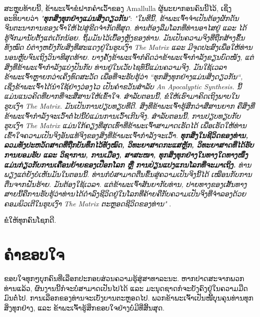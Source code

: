 \documentclass[10pt,twocolumn,letterpaper]{article}
\renewcommand{\refname}{ເອກະສານອ້າງອີງ}
\begin{document}
ສະຫຼຸບທ້າຍນີ້, ຂ້າພະເຈົ້າຂໍຝາກຄຳເວົ້າຂອງ Amallulla ຜູ້ພະຍາກອນຄົນນີ້ໄວ້, ເຊິ່ງອະທິບາຍວ່າ \textit{"\textbf{ທຸກສິ່ງທຸກຢ່າງແມ່ນສິ່ງດຽວກັນ}"}: \textit{"ໃນທີ່ນີ້, ຂ້າພະເຈົ້າຈຳເປັນຕ້ອງຜັກດັນຈິນຕະນາການຂອງເຈົ້າໃຫ້ໄປສູ່ຂີດຈຳກັດທີ່ສຸດ. ທ່ານຕ້ອງລືມໂລກທີ່ທ່ານອາໄສຢູ່ ແລະ ໄດ້ຮູ້ຈັກມານັບຕັ້ງແຕ່ເດັກນ້ອຍ. ຖິ້ມມັນໄວ້ເບື້ອງຫຼັງຂອງທ່ານ. ມັນເປັນຄວາມຈິງທີ່ຖືກສ້າງຂຶ້ນທັງໝົດ ບໍ່ຕ່າງຫຍັງກັບສິ່ງທີ່ສະແດງຢູ່ໃນຮູບເງົາ The Matrix ແລະ ມີຈຸດປະສົງເພື່ອໃຫ້ທ່ານນອນຫຼັບຈົນເຖິງວິນາທີສຸດທ້າຍ. ບາງຄັ້ງຂ້າພະເຈົ້າກໍຄິດວ່າຂ້າພະເຈົ້າກໍາລັງຂຽນບົດໜັງ, ແຕ່ສິ່ງທີ່ຂ້າພະເຈົ້າກໍາລັງແບ່ງປັນກັບ \cite{176} ທ່ານຢູ່ໃນເວັບໄຊທ໌ນີ້ແມ່ນຄວາມຈິງ. ມັນໃຊ້ເວລາຂ້າພະເຈົ້າຫຼາຍກວ່າເຄິ່ງທົດສະວັດ ເພື່ອທີ່ຈະຮັບຮູ້ວ່າ “ທຸກສິ່ງທຸກຢ່າງແມ່ນສິ່ງດຽວກັນ“, ເຊິ່ງຂ້າພະເຈົ້າໄດ້ນຳໃຊ້ຢ່າງວ່ອງໄວ ເປັນຄໍາຂວັນສໍາລັບ An Apocalyptic Synthesis. ນີ້​ແມ່ນ​ແນວ​ຄິດ​ທີ່​ຍາກ​ທີ່​ຈະ​ສື່​ສານ​ໃຫ້​ເຂົ້າ​ໃຈ. ສຳລັບຕອນນີ້, ຂໍໃຫ້ເຮົາມາຄິດເຖິງພາບໃນຮູບເງົາ The Matrix. ມັນເປັນການປຽບທຽບທີ່ດີ. ສິ່ງທີ່ຂ້າພະເຈົ້າຮູ້ສຶກວ່າສື່ສານຍາກ ຄືສິ່ງທີ່ຂ້າພະເຈົ້າກໍາລັງຈະເວົ້າຕໍ່ໄປນີ້ບໍ່ແມ່ນການເວົ້າເກີນຈິງ. \cite{177}
ສຳລັບຕອນນີ້, ການປຽບທຽບກັບຮູບເງົາ The Matrix ແມ່ນໃກ້ຄຽງທີ່ສຸດເທົ່າທີ່ຂ້າພະເຈົ້າສາມາດເຮັດໄດ້ ເພື່ອເຮັດໃຫ້ທ່ານເຂົ້າໃຈຄວາມເປັນຈິງອັນແທ້ຈິງຂອງສິ່ງທີ່ຂ້າພະເຈົ້າກຳລັງຈະເວົ້າ. \cite{178}
\textbf{ທຸກສິ່ງໃນຊີວິດຂອງທ່ານ, ລວມທັງປະຫວັດສາດທີ່ຖືກບັນທຶກໄວ້ທັງໝົດ, ວິທະຍາສາດກະແສຫຼັກ, ວິທະຍາສາດທີ່ໄດ້ຮັບການຍອມຮັບ ແລະ ວິຊາການ, ການເມືອງ, ສາສະໜາ, ທຸກສິ່ງທຸກຢ່າງໃນທາງໃດທາງໜຶ່ງ ແມ່ນກ່ຽວກັບການເຄື່ອນຍ້າຍຂອງເປືອກໂລກ ຫຼື ການປ່ຽນແປງແກນໂລກທີ່ຈະມາເຖິງ.} ທ່ານພຽງແຕ່ຍັງບໍ່ເຫັນມັນໃນຕອນນີ້. \cite{179}
ທ່ານກໍບໍ່ສາມາດຕື່ນຂຶ້ນສູ່ຄວາມເປັນຈິງນີ້ໄດ້ ເໝືອນກັບການຕື່ນຈາກຝັນຮ້າຍ. ມັນຕ້ອງໃຊ້ເວລາ. \cite{180}
ແຕ່ຂ້າພະເຈົ້າສັນຍາກັບທ່ານ, ປາຍທາງຂອງເສັ້ນທາງສາຍນີ້ຄືການຮັບຮູ້ວ່າທ່ານໄດ້ດໍາລົງຊີວິດຢູ່ໃນໂລກທີ່ຄ້າຍຄືກັບຄວາມເປັນຈິງທີ່ຈຳລອງດ້ວຍຄອມພິວເຕີໃນຮູບເງົາ The Matrix ຕະຫຼອດຊີວິດຂອງທ່ານ"} \cite{33,34}.

ຂໍໃຫ້ທຸກຄົນໂຊກດີ.
\section{ຄຳຂອບໃຈ}

ຂອບໃຈທຸກໆບຸກຄົນທີ່ເລືອກປະກອບສ່ວນຄວາມຮູ້ສູ່ສາທາລະນະ. ຫາກປາດສະຈາກພວກທ່ານແລ້ວ, ຜົນງານນີ້ກໍຈະບໍ່ສາມາດເປັນໄປໄດ້ ແລະ ມະນຸດຊາດກໍຈະຍັງຄົງຢູ່ໃນຄວາມມືດມົນຕໍ່ໄປ. ການເລືອກຂອງທ່ານຈະເບັ່ງບານຕະຫຼອດໄປ. ພວກຂ້າພະເຈົ້າເປັນໜີ້ບຸນຄຸນທ່ານທຸກສິ່ງທຸກຢ່າງ, ແລະ ຂ້າພະເຈົ້າຮູ້ສຶກຂອບໃຈຢ່າງບໍ່ມີທີ່ສິ້ນສຸດ.

\clearpage
\twocolumn

{\small


}
\end{document}
